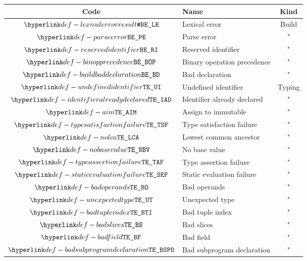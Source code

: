 \begin{center}
\begin{tabular}{clc}
\hline
\textbf{Code} & \textbf{Name} & \textbf{Kind} \\
\hline
  $\LexicalError$                & Lexical error                  & Build         \\
  $\ParseError$                  & Parse error                    & "             \\
  $\ReservedIdentifier$          & Reserved identifier            & "             \\
  $\BinopPrecedence$             & Binary operation precedence    & "             \\
  $\BuildBadDeclaration$         & Bad declaration                & "             \\
  \hline
  $\UndefinedIdentifier$         & Undefined identifier           & Typing        \\
  $\IdentifierAlreadyDeclared$   & Identifier already declared    & "             \\
  $\AssignmentToImmutable$       & Assign to immutable            & "             \\
  $\TypeSatisfactionFailure$     & Type satisfaction failure      & "             \\
  $\NoLCA$                       & Lowest common ancestor         & "             \\
  $\NoBaseValue$                 & No base value                  & "             \\
  $\TypeAssertionFailure$        & Type assertion failure         & "             \\
  $\StaticEvaluationFailure$     & Static evaluation failure      & "             \\
  $\BadOperands$                 & Bad operands                   & "             \\
  $\UnexpectedType$              & Unexpected type                & "             \\
  $\BadTupleIndex$               & Bad tuple index                & "             \\
  $\BadSlices$                   & Bad slices                     & "             \\
  $\BadField$                    & Bad field                      & "             \\
  $\BadSubprogramDeclaration$    & Bad subprogram declaration     & "             \\

\end{tabular}
\end{center}
